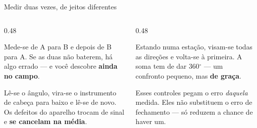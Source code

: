 \documentclass[aspectratio=169,11pt]{beamer}
\newcommand{\bnum}[1]{\textbf{\textcolor{mTeal}{#1}}}
\begin{document}
\begin{frame}{Medir duas vezes, de jeitos diferentes}
  \begin{columns}[T]
    \begin{column}{0.48\textwidth}
      \begin{ideia}[title={A distância, nos dois sentidos}]
        Mede-se de A para B e depois de B para A. Se as duas não baterem, há algo errado
        --- e você descobre \bnum{ainda no campo}.
      \end{ideia}
      \medskip
      \begin{ideia}[title={O ângulo, repetido}]
        Lê-se o ângulo, vira-se o instrumento de cabeça para baixo e lê-se de novo. Os
        defeitos do aparelho trocam de sinal e \bnum{se cancelam na média}.
      \end{ideia}
    \end{column}
    \begin{column}{0.48\textwidth}
      \begin{ideia}[title={Fechamento do horizonte}]
        Estando numa estação, visam-se todas as direções e volta-se à primeira. A soma tem
        de dar $360\ensuremath{^\circ}$ --- um confronto pequeno, mas \bnum{de graça}.
      \end{ideia}
      \medskip
      \begin{cuidado}[title={Nada disso conserta tudo}]
        \small Esses controles pegam o erro \emph{daquela} medida. Eles não substituem o
        erro de fechamento --- só reduzem a chance de haver um.
      \end{cuidado}
    \end{column}
  \end{columns}
\end{frame}
\end{document}
